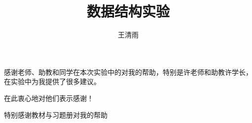 \documentclass[format=draft,language=chinese,category=academic-report]{hustreport}
\title{数据结构实验}
\author{王清雨}
\begin{document}
\frontmatter
\maketitle
\tableofcontents

\mainmatter











\backmatter

\begin{ack}
    感谢老师、助教和同学在本次实验中的对我的帮助，特别是许老师和助教许学长，在实验中为我提供了很多建议。
    \par
    在此衷心地对他们表示感谢！
    \par
    特别感谢教材\cite{严蔚敏2002数据结构}与习题册\cite{严蔚敏1998数据结构题集}对我的帮助
\end{ack}



\appendix
\end{document}
